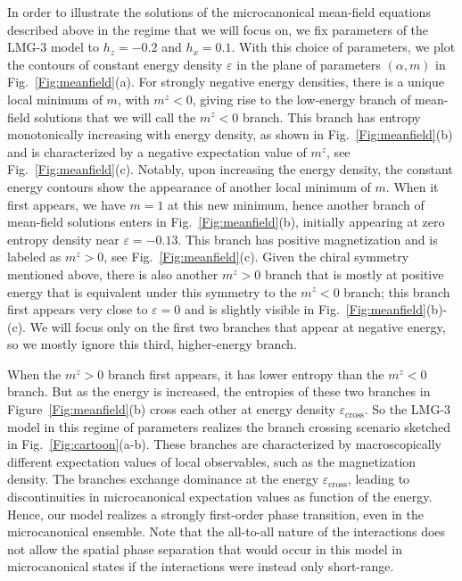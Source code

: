 \documentclass[aps,prx,showpacs,amsmath,amssymb,superscriptaddress,twocolumn,longbibliography,10pt,nofootinbib]{revtex4-2}
\begin{document}
In order to illustrate the solutions of the microcanonical mean-field equations described above in the regime that we will focus on, we fix parameters of the LMG-3 model to $h_z=-0.2$ and $h_x=0.1$.  With this choice of parameters, we plot the contours of constant energy density $\varepsilon$ in the plane of parameters $(\alpha,m)$ in Fig.~\ref{Fig:meanfield}(a). For strongly negative energy densities, there is a unique local minimum of $m$, with $m^z<0$, giving rise to the low-energy branch of mean-field solutions that we will call the $m^z<0$ branch.  This branch has entropy monotonically increasing with energy density, as shown in Fig.~\ref{Fig:meanfield}(b) and is characterized by a negative expectation value of $m^z$, see Fig.~\ref{Fig:meanfield}(c). Notably, upon increasing the energy density, the constant energy contours show the appearance of another local minimum of $m$.  When it first appears, we have $m=1$ at this new minimum, hence another branch of mean-field solutions enters in Fig.~\ref{Fig:meanfield}(b), initially appearing at zero entropy density near $\varepsilon=-0.13$. This branch has positive magnetization and is labeled as $m^z>0$, see Fig.~\ref{Fig:meanfield}(c). Given the chiral symmetry mentioned above, there is also another $m^z>0$ branch that is mostly at positive energy that is equivalent under this symmetry to the $m^z<0$ branch; this branch first appears very close to $\varepsilon=0$ and is slightly visible in Fig.~\ref{Fig:meanfield}(b)-(c).  We will focus only on the first two branches that appear at negative energy, so we mostly ignore this third, higher-energy branch.

When the $m^z>0$ branch first appears, it has lower entropy than the $m^z<0$ branch.  But as the energy is increased, the entropies of these two branches in Figure~\ref{Fig:meanfield}(b) cross each other at energy density $\varepsilon_\text{cross}$. So the LMG-3 model in this regime of parameters realizes the branch crossing scenario sketched in Fig.~\ref{Fig:cartoon}(a-b). These branches are characterized by macroscopically different expectation values of local observables, such as the magnetization density. The branches exchange dominance at the energy $\varepsilon_\text{cross}$, leading to discontinuities in microcanonical expectation values as function of the energy. Hence, our model realizes a strongly first-order phase transition, even in the microcanonical ensemble. Note that the all-to-all nature of the interactions does not allow the spatial phase separation that would occur in this model in microcanonical states if the interactions were instead only short-range.
\end{document}
